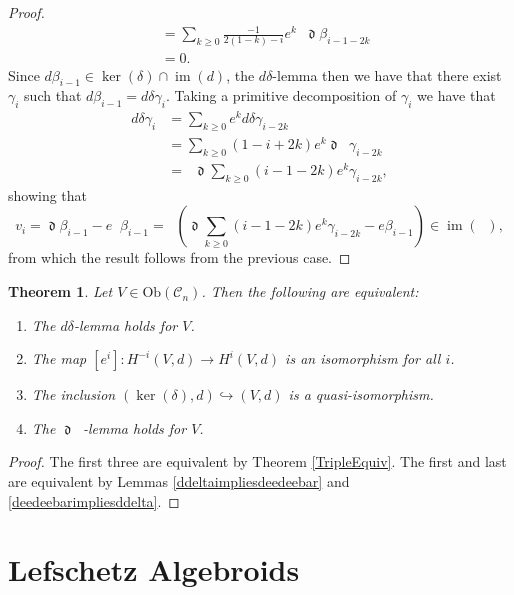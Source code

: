 \documentclass{amsart}
\newcommand{\ra}{\rightarrow}
\newtheorem{theorem}{Theorem}
\DeclareMathOperator{\dee}{\mathfrak{d}}
\DeclareMathOperator{\deebar}{\overline{\mathfrak{d}}}
\theoremstyle{definition}
\DeclareMathOperator{\im}{im}
\begin{document}
\begin{proof}
\begin{align*}
        &=\sum_{k \geq 0} \frac{-1}{2(1-k)-i} e^k \deebar \dee \beta_{i-1-2k} \\
        &=0.
    \end{align*}
    Since $d \beta_{i-1} \in \ker(\delta) \cap \im(d)$, the $d \delta$-lemma then we have that there exist $\gamma_i$ such that $d\beta_{i-1} = d \delta \gamma_i$. Taking a primitive decomposition of $\gamma_i$ we have that
    \begin{align*}
        d \delta \gamma_i &= \sum_{k \geq 0} e^k d \delta \gamma_{i-2k} \\
        &=\sum_{k \geq 0} (1-i+2k)e^k \dee \deebar \gamma_{i-2k} \\
        &=\deebar \dee \sum_{k \geq 0} (i-1-2k)e^k\gamma_{i-2k},
    \end{align*}
    showing that
    \begin{equation*}
        v_i = \dee \beta_{i-1} - e\deebar \beta_{i-1} = \deebar \left( \dee \sum_{k \geq 0}(i-1-2k)e^k\gamma_{i-2k} - e\beta_{i-1} \right) \in \im(\deebar),
    \end{equation*}
    from which the result follows from the previous case.
\end{proof}
\begin{theorem}\label{QuadEquiv}
    Let $V \in \mathrm{Ob}(\mathscr{C}_n)$. Then the following are equivalent:
    \begin{enumerate}
        \item The $d\delta$-lemma holds for $V$.
        \item The map $[e^i]:H^{-i}(V,d) \ra H^i(V,d)$ is an isomorphism for all $i$.
        \item The inclusion $(\ker(\delta),d) \hookrightarrow (V,d)$ is a quasi-isomorphism.
        \item The $\dee \deebar$-lemma holds for $V$.
    \end{enumerate}
\end{theorem}
\begin{proof}
    The first three are equivalent by Theorem \ref{TripleEquiv}. The first and last are equivalent by Lemmas \ref{ddeltaimpliesdeedeebar} and \ref{deedeebarimpliesddelta}.
\end{proof}


\section{Lefschetz Algebroids}
\end{document}
